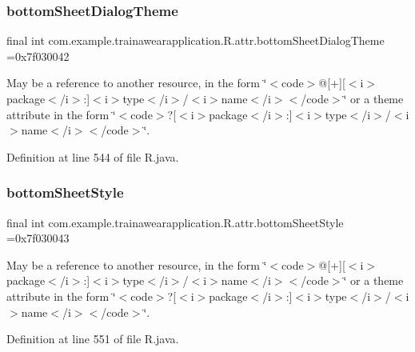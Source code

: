 \subsubsection{\texorpdfstring{bottomSheetDialogTheme}{bottomSheetDialogTheme}}
{\footnotesize\ttfamily final int com.\+example.\+trainawearapplication.\+R.\+attr.\+bottom\+Sheet\+Dialog\+Theme =0x7f030042\hspace{0.3cm}{\ttfamily [static]}}

May be a reference to another resource, in the form \char`\"{}$<$code$>$@\mbox{[}+\mbox{]}\mbox{[}$<$i$>$package$<$/i$>$\+:\mbox{]}$<$i$>$type$<$/i$>$/$<$i$>$name$<$/i$>$$<$/code$>$\char`\"{} or a theme attribute in the form \char`\"{}$<$code$>$?\mbox{[}$<$i$>$package$<$/i$>$\+:\mbox{]}$<$i$>$type$<$/i$>$/$<$i$>$name$<$/i$>$$<$/code$>$\char`\"{}. 

Definition at line 544 of file R.\+java.

\mbox{\label{classcom_1_1example_1_1trainawearapplication_1_1_r_1_1attr_ae5a66b0ae525a15224d600774d5eba5c}} 
\subsubsection{\texorpdfstring{bottomSheetStyle}{bottomSheetStyle}}
{\footnotesize\ttfamily final int com.\+example.\+trainawearapplication.\+R.\+attr.\+bottom\+Sheet\+Style =0x7f030043\hspace{0.3cm}{\ttfamily [static]}}

May be a reference to another resource, in the form \char`\"{}$<$code$>$@\mbox{[}+\mbox{]}\mbox{[}$<$i$>$package$<$/i$>$\+:\mbox{]}$<$i$>$type$<$/i$>$/$<$i$>$name$<$/i$>$$<$/code$>$\char`\"{} or a theme attribute in the form \char`\"{}$<$code$>$?\mbox{[}$<$i$>$package$<$/i$>$\+:\mbox{]}$<$i$>$type$<$/i$>$/$<$i$>$name$<$/i$>$$<$/code$>$\char`\"{}. 

Definition at line 551 of file R.\+java.

\mbox{\label{classcom_1_1example_1_1trainawearapplication_1_1_r_1_1attr_a35493a456a4ca163adf9f78790d512cb}} 
